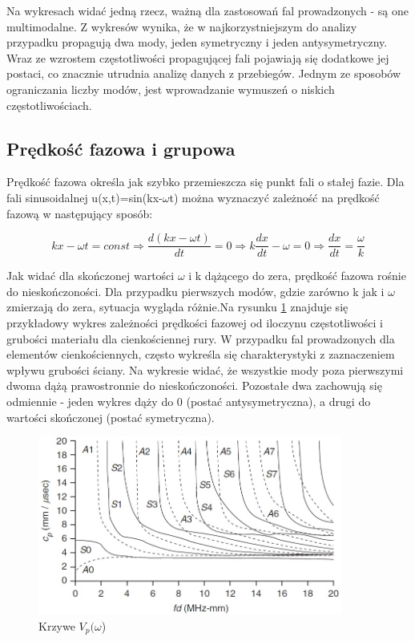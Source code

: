 Na wykresach widać jedną rzecz, ważną dla zastosowań fal prowadzonych - są one multimodalne. Z wykresów wynika, że w najkorzystniejszym do analizy przypadku propagują dwa mody, jeden symetryczny i jeden antysymetryczny. Wraz ze wzrostem częstotliwości propagującej fali pojawiają się dodatkowe jej postaci, co znacznie utrudnia analizę danych z przebiegów. Jednym ze sposobów ograniczania liczby modów, jest wprowadzanie wymuszeń o niskich częstotliwościach.

\subsection{Prędkość fazowa i grupowa}

Prędkość fazowa określa jak szybko przemieszcza się punkt fali o stałej fazie. Dla fali sinusoidalnej u(x,t)=sin(kx-\(\omega\)t) można wyznaczyć zależność na prędkość fazową w następujący sposób:

\begin{equation}
kx-\omega t=const \Rightarrow \frac{d(kx-\omega t)}{dt}=0 \Rightarrow k\frac{dx}{dt}-\omega=0
 \Rightarrow \frac{dx}{dt}=\frac{\omega}{k}
\end{equation}

Jak widać dla skończonej wartości \(\omega\) i k dążącego do zera, prędkość fazowa rośnie do nieskończoności. Dla przypadku pierwszych modów, gdzie zarówno k jak i \(\omega\) zmierzają do zera, sytuacja wygląda różnie.Na rysunku \ref{fig:krzywe_vp_od_omega} znajduje się przykładowy wykres zależności prędkości fazowej od iloczynu częstotliwości i grubości materiału dla cienkościennej rury. W przypadku fal prowadzonych dla elementów cienkościennych, często wykreśla się charakterystyki z zaznaczeniem wpływu grubości ściany. Na wykresie widać, że wszystkie mody poza pierwszymi dwoma dążą prawostronnie do nieskończoności. Pozostałe dwa zachowują się odmiennie - jeden wykres dąży do 0 (postać antysymetryczna), a drugi do wartości skończonej (postać symetryczna).

\begin{figure}[h]
\centering
\includegraphics[width=10cm]{Zdjecia/2/char_predkosc_fazowa}
\caption{Krzywe \(V_p(\omega\))}
\label{fig:krzywe_vp_od_omega}
\end{figure}

